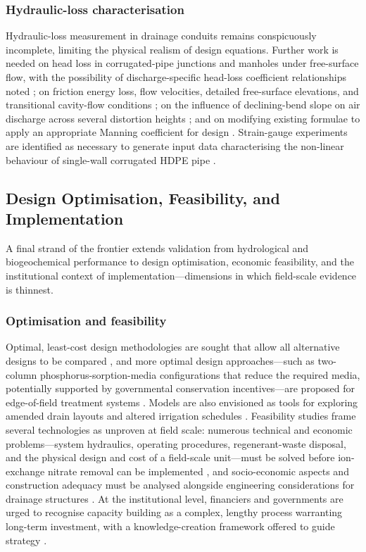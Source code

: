 \documentclass[11pt]{article}
\begin{document}
\subsubsection{Hydraulic-loss characterisation}

Hydraulic-loss measurement in drainage conduits remains conspicuously incomplete, limiting the physical realism of design equations. Further work is needed on head loss in corrugated-pipe junctions and manholes under free-surface flow, with the possibility of discharge-specific head-loss coefficient relationships noted \parencite{Bayat2011}; on friction energy loss, flow velocities, detailed free-surface elevations, and transitional cavity-flow conditions \parencite{Nédélec2008}; on the influence of declining-bend slope on air discharge across several distortion heights \parencite{Gurklys2008}; and on modifying existing formulae to apply an appropriate Manning coefficient for design \parencite{Kouchakzadeh2011}. Strain-gauge experiments are identified as necessary to generate input data characterising the non-linear behaviour of single-wall corrugated HDPE pipe \parencite{Gaj2021}.

\subsection{Design Optimisation, Feasibility, and Implementation}

A final strand of the frontier extends validation from hydrological and biogeochemical performance to design optimisation, economic feasibility, and the institutional context of implementation---dimensions in which field-scale evidence is thinnest.

\subsubsection{Optimisation and feasibility}

Optimal, least-cost design methodologies are sought that allow all alternative designs to be compared \parencite{Bakour2021}, and more optimal design approaches---such as two-column phosphorus-sorption-media configurations that reduce the required media, potentially supported by governmental conservation incentives---are proposed for edge-of-field treatment systems \parencite{Hauda2020}. Models are also envisioned as tools for exploring amended drain layouts and altered irrigation schedules \parencite{Alzraiee2013b}. Feasibility studies frame several technologies as unproven at field scale: numerous technical and economic problems---system hydraulics, operating procedures, regenerant-waste disposal, and the physical design and cost of a field-scale unit---must be solved before ion-exchange nitrate removal can be implemented \parencite{MAGETTE1990}, and socio-economic aspects and construction adequacy must be analysed alongside engineering considerations for drainage structures \parencite{Bozic2014}. At the institutional level, financiers and governments are urged to recognise capacity building as a complex, lengthy process warranting long-term investment, with a knowledge-creation framework offered to guide strategy \parencite{Ritzema2008}.
\end{document}
